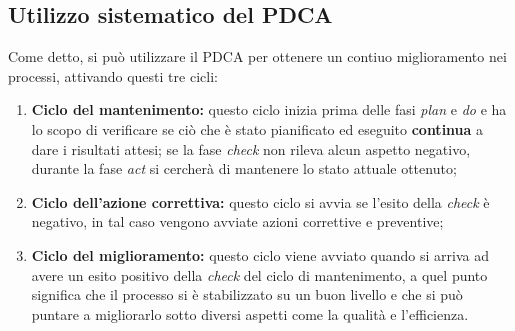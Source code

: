 \subsection{Utilizzo sistematico del PDCA}
Come detto, si può utilizzare il PDCA per ottenere un contiuo miglioramento nei processi, attivando questi tre cicli:
\begin{enumerate}
	\item{\bf Ciclo del mantenimento:} questo ciclo inizia prima delle fasi \emph{plan} e \emph{do} e ha lo scopo di verificare se ciò che è stato pianificato ed eseguito \textbf{continua} a dare i risultati attesi; se la fase \emph{check} non rileva alcun aspetto negativo, durante la fase \emph{act} si cercherà di mantenere lo stato attuale ottenuto;
	\item{\bf Ciclo dell'azione correttiva:} questo ciclo si avvia se l'esito della \emph{check} è negativo, in tal caso vengono avviate azioni correttive e preventive;
	\item{\bf Ciclo del miglioramento:} questo ciclo viene avviato quando si arriva ad avere un esito positivo della \emph{check} del ciclo di mantenimento, a quel punto significa che il processo si è stabilizzato su un buon livello e che si può puntare a migliorarlo sotto diversi aspetti come la qualità e l'efficienza.
\end{enumerate}